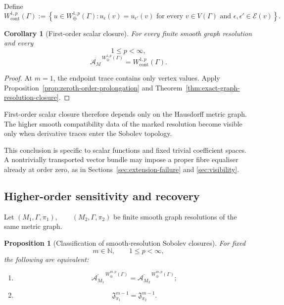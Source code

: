 \documentclass[11pt]{article}
\theoremstyle{plain}
\newtheorem{proposition}[theorem]{Proposition}
\newtheorem{corollary}[theorem]{Corollary}
\theoremstyle{definition}
\begin{document}
Define
\[
  W_{\mathrm{cont}}^{1,p}(\Gamma)
  :=
  \left\{
    u\in W_\oplus^{1,p}(\Gamma):
    u_\epsilon(v)
    =
    u_{\epsilon'}(v)
    \text{ for every }
    v\in V(\Gamma)
    \text{ and }
    \epsilon,\epsilon'\in\mathcal E(v)
  \right\}.
\]

\begin{corollary}[First-order scalar closure]
\label{cor:universal-first-order-graph-closure}
For every finite smooth graph resolution and every
\[
  1\leq p<\infty,
\]
\[
  \boxed{
  \overline{\mathscr A_M}^{\,W_\oplus^{1,p}(\Gamma)}
  =
  W_{\mathrm{cont}}^{1,p}(\Gamma).
  }
\]
\end{corollary}

\begin{proof}
At \(m=1\), the endpoint trace contains only vertex values. Apply
Proposition~\ref{prop:zeroth-order-prolongation}
and
Theorem~\ref{thm:exact-graph-resolution-closure}.
\end{proof}

First-order scalar closure therefore depends only on the Hausdorff
metric graph. The higher smooth compatibility data of the marked
resolution become visible only when derivative traces enter the
Sobolev topology.

This conclusion is specific to scalar functions and fixed trivial
coefficient spaces. A nontrivially transported vector bundle may
impose a proper fibre equaliser already at order zero, as in
Sections~\ref{sec:extension-failure} and \ref{sec:visibility}.

\subsection{Higher-order sensitivity and recovery}
\label{subsec:graph-recovery}

Let \((M_1,\Gamma,\pi_1), \qquad (M_2,\Gamma,\pi_2)\) be finite smooth graph resolutions of the same metric graph.

\begin{proposition}[Classification of smooth-resolution Sobolev closures]
\label{prop:classification-marked-closures}
For fixed
\[
  m\in\mathbb N,
  \qquad
  1\leq p<\infty,
\]
the following are equivalent:

\begin{enumerate}[label=\textup{(\roman*)}]
  \item
        \[
          \overline{\mathscr A_{M_1}}^{\,W_\oplus^{m,p}(\Gamma)}
          =
          \overline{\mathscr A_{M_2}}^{\,W_\oplus^{m,p}(\Gamma)};
        \]

  \item
        \[
          \mathfrak J_{\pi_1}^{m-1}
          =
          \mathfrak J_{\pi_2}^{m-1}.
        \]
\end{enumerate}
\end{proposition}
\end{document}

